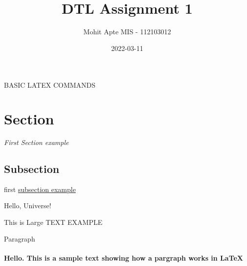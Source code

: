 \documentclass{article}
\title{\textbf{DTL Assignment 1}}
\date{2022-03-11}
\author{Mohit Apte MIS - 112103012}
\begin{document}
\maketitle
\begin{LARGE}
\begin{center}
BASIC LATEX COMMANDS
\end{center}
\end{LARGE}
\section{Section}
\textit{First Section example}
\subsection{Subsection}
first \underline{subsection example}
\newpage
\begin{LARGE}
\begin{center}
Hello, Universe!
\end{center}
\end{LARGE}
\begin{LARGE}
This is Large TEXT EXAMPLE
\end{LARGE}
\newpage
Paragraph
\paragraph{Hello. This is a sample text showing how a pargraph works in LaTeX}
\end{document}
